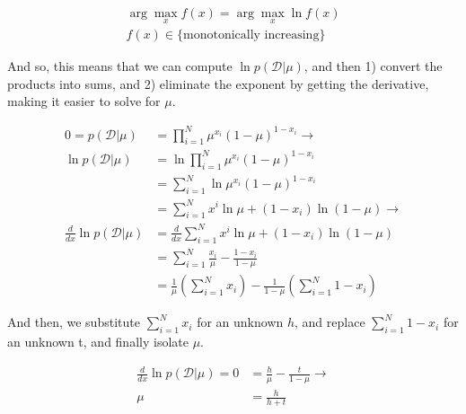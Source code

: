 \documentclass{tufte-handout}
\begin{document}
\begin{equation} \label{equation:lnidentity}
  \begin{aligned}
    \arg \max\limits_x f(x) = \arg\max\limits_x \ln f(x) \\
    f(x) \in \{\text{monotonically increasing}\}
  \end{aligned}
\end{equation}

And so, this means that we can compute $\ln p(\mathcal{D}|\mu)$, and then 1)
convert the products into sums, and 2) eliminate the exponent by getting the
derivative, making it easier to solve for $\mu$.

\begin{equation}
  \begin{aligned}
    0 = p(\mathcal{D}|\mu)              &= \prod\limits_{i = 1}^N \mu^{x_i}(1 - \mu)^{1 - x_i} \rightarrow \\
    \ln p(\mathcal{D}|\mu)              &= \ln \prod\limits_{i = 1}^N \mu^{x_i}(1 - \mu)^{1 - x_i} \\
                                        &= \sum\limits_{i = 1}^N \ln \mu^{x_i}(1 - \mu)^{1 - x_i} \\
                                        &= \sum\limits_{i = 1}^N x^i \ln \mu + (1 - x_i)\ln (1 - \mu) \rightarrow \\
    \frac{d}{dx} \ln p(\mathcal{D}|\mu) &= \frac{d}{dx} \sum\limits_{i = 1}^N x^i \ln \mu + (1 - x_i)\ln (1 - \mu) \\
                                        &= \sum\limits_{i = 1}^N \frac{x_i}{\mu} - \frac{1 - x_i}{1 - \mu} \\
                                        &= \frac{1}{\mu} (\sum\limits_{i = 1}^N x_i) - \frac{1}{1 - \mu}(\sum\limits_{i = 1}^N1 - x_i)
  \end{aligned}
\end{equation}

And then, we substitute $\sum\limits_{i = 1}^Nx_i$ for an unknown $h$, and
replace $\sum\limits_{i = 1}^N1-x_i$ for an unknown t, and finally isolate $\mu$.

\begin{equation}
  \begin{aligned}
    \frac{d}{dx} \ln p(\mathcal{D}|\mu) = 0 &= \frac{h}{\mu} - \frac{t}{1 - \mu} \rightarrow \\
    \mu &= \frac{h}{h + t}
  \end{aligned}
\end{equation}

% 
% 
\end{document}
